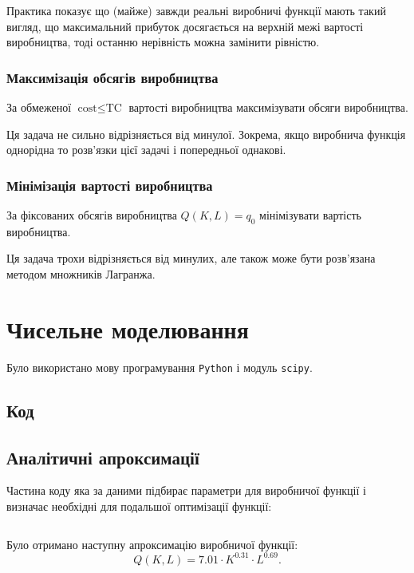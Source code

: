 Практика показує що (майже) завжди реальні виробничі функції мають такий вигляд, що максимальний прибуток досягається на верхній межі вартості виробництва, тоді останню нерівність можна замінити рівністю.

\subsubsection{Максимізація обсягів виробництва}

За обмеженої $\text{cost} \le \text{TC}$ вартості виробництва максимізувати обсяги виробництва. \medskip

Ця задача не сильно відрізняється від минулої. Зокрема, якщо виробнича функція однорідна то розв'язки цієї задачі і попередньої однакові.

\subsubsection{Мінімізація вартості виробництва}

За фіксованих обсягів виробництва $Q(K, L) = q_0$ мінімізувати вартість виробництва. \medskip

Ця задача трохи відрізняється від минулих, але також може бути розв'язана методом множників Лагранжа.

\section{Чисельне моделювання}

Було використано мову програмування \texttt{Python} і модуль \texttt{scipy}.

\subsection{Код}

\subsection{Аналітичні апроксимації}

Частина коду яка за даними підбирає параметри для виробничої функції і визначає необхідні для подальшої оптимізації функції:

\inputminted[lastline=52]{python}{../py/all.py}

Було отримано наступну апроксимацію виробничої функції: \[ Q(K, L) = 7.01 \cdot K^{0.31} \cdot L^{0.69}. \]

